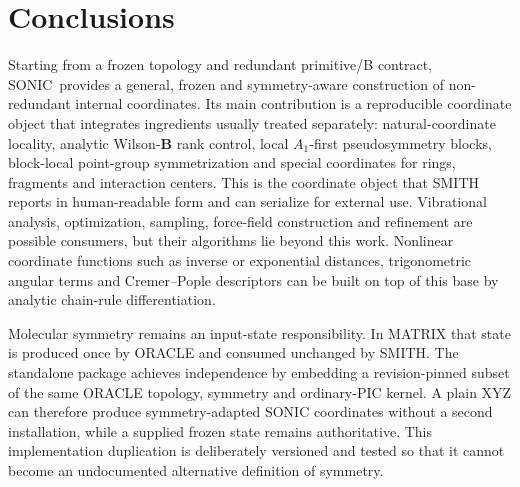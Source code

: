 \documentclass[journal=jctcce,manuscript=article,layout=traditional]{achemso}
\newcommand{\SONIC}{SONIC}
\newcommand{\Bmat}{\mathbf{B}}
\theoremstyle{definition}
\begin{document}
\section{Conclusions}

Starting from a frozen topology and redundant primitive/B contract, \SONIC\ provides a general, frozen and symmetry-aware construction of
non-redundant internal coordinates.  Its main contribution is a
reproducible coordinate object that integrates ingredients usually treated
separately: natural-coordinate locality, analytic Wilson-\(\Bmat\) rank control,
local \(A_1\)-first pseudosymmetry blocks, block-local point-group
symmetrization and special coordinates for
rings, fragments and interaction centers.  This is the coordinate object
that SMITH reports in human-readable form and can serialize for external use.
Vibrational analysis, optimization, sampling, force-field construction and
refinement are possible consumers, but their algorithms lie beyond this work.
Nonlinear coordinate functions such as inverse or exponential distances,
trigonometric angular terms and Cremer--Pople descriptors can be built on top of
this base by analytic chain-rule differentiation.

Molecular symmetry remains an input-state responsibility.  In MATRIX that
state is produced once by ORACLE and consumed unchanged by SMITH.  The
standalone package achieves independence by embedding a revision-pinned subset
of the same ORACLE topology, symmetry and ordinary-PIC kernel.  A plain XYZ can
therefore produce symmetry-adapted SONIC coordinates without a second
installation, while a supplied frozen state remains authoritative.  This
implementation duplication is deliberately versioned and tested so that it
cannot become an undocumented alternative definition of symmetry.
\end{document}
